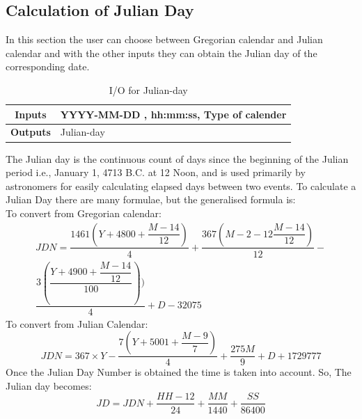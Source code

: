 \subsection{Calculation of Julian Day}
In this section the user can choose between Gregorian calendar and Julian calendar and with the other inputs they can obtain the Julian day of the corresponding date. 
\begin{table}[H]
\centering
\begin{tabular}{@{}cl@{}}
\toprule
\textbf{Inputs}  & YYYY-MM-DD , hh:mm:ss, Type of calender \\ \midrule
\textbf{Outputs} & Julian-day  \\ \bottomrule                                              
\end{tabular}
\caption{I/O for Julian-day}
\label{tab:jd}
\end{table}
The Julian day is the continuous count of days since the beginning of the Julian period i.e., January 1, 4713 B.C. at 12 Noon, and is used primarily by astronomers for easily calculating elapsed days between two events.
To calculate a Julian Day there are many formulae, but the generalised formula is:\\
To convert from Gregorian calendar:
\begin{multline*}
JDN = \dfrac{1461\left(Y+4800+\dfrac{M-14}{12}\right)}{4}+\dfrac{367\left(M-2-12\dfrac{M-14}{12}\right)}{12} - \\
\dfrac{3\left( \dfrac{Y+4900+\dfrac{M-14}{12}}{100}\right))}{4}+D-32075
\end{multline*}
To convert from Julian Calendar:
$$JDN = 367 \times Y - \dfrac{7 \left( Y+5001+\dfrac{M-9}{7}\right)}{4}+\dfrac{275M}{9}+D+1729777$$
Once the Julian Day Number is obtained the time is taken into account. So, The Julian day becomes:
$$JD = JDN+\dfrac{HH-12}{24}+\dfrac{MM}{1440}+\dfrac{SS}{86400}$$
